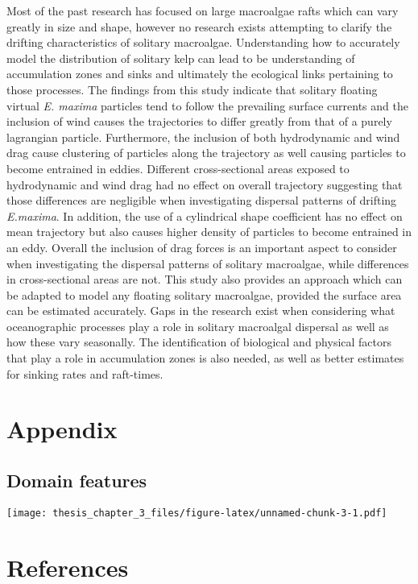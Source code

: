 \documentclass[
]{article}
\begin{document}
Most of the past research has focused on large macroalgae rafts which
can vary greatly in size and shape, however no research exists
attempting to clarify the drifting characteristics of solitary
macroalgae. Understanding how to accurately model the distribution of
solitary kelp can lead to be understanding of accumulation zones and
sinks and ultimately the ecological links pertaining to those processes.
The findings from this study indicate that solitary floating virtual
\emph{E. maxima} particles tend to follow the prevailing surface
currents and the inclusion of wind causes the trajectories to differ
greatly from that of a purely lagrangian particle. Furthermore, the
inclusion of both hydrodynamic and wind drag cause clustering of
particles along the trajectory as well causing particles to become
entrained in eddies. Different cross-sectional areas exposed to
hydrodynamic and wind drag had no effect on overall trajectory
suggesting that those differences are negligible when investigating
dispersal patterns of drifting \emph{E.maxima}. In addition, the use of
a cylindrical shape coefficient has no effect on mean trajectory but
also causes higher density of particles to become entrained in an eddy.
Overall the inclusion of drag forces is an important aspect to consider
when investigating the dispersal patterns of solitary macroalgae, while
differences in cross-sectional areas are not. This study also provides
an approach which can be adapted to model any floating solitary
macroalgae, provided the surface area can be estimated accurately. Gaps
in the research exist when considering what oceanographic processes play
a role in solitary macroalgal dispersal as well as how these vary
seasonally. The identification of biological and physical factors that
play a role in accumulation zones is also needed, as well as better
estimates for sinking rates and raft-times.

\hypertarget{appendix}{%
\section{Appendix}\label{appendix}}

\hypertarget{domain-features}{%
\subsection{Domain features}\label{domain-features}}

\texttt{[image: thesis\_chapter\_3\_files/figure-latex/unnamed-chunk-3-1.pdf]}

\hypertarget{references}{%
\section*{References}\label{references}}
\end{document}
